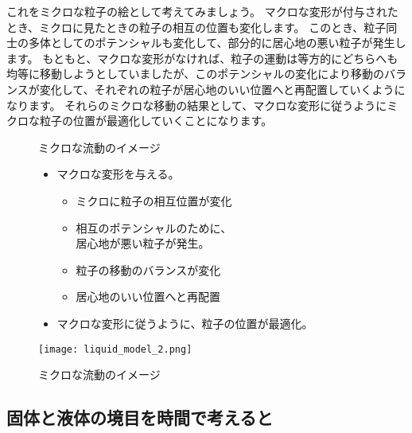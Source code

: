 \documentclass[uplatex,dvipdfmx,a4paper,11pt]{jsarticle}
\begin{document}
これをミクロな粒子の絵として考えてみましょう。
マクロな変形が付与されたとき、ミクロに見たときの粒子の相互の位置も変化します。
このとき、粒子同士の多体としてのポテンシャルも変化して、部分的に居心地の悪い粒子が発生します。
もともと、マクロな変形がなければ、粒子の運動は等方的にどちらへも均等に移動しようとしていましたが、このポテンシャルの変化により移動のバランスが変化して、それぞれの粒子が居心地のいい位置へと再配置していくようになります。
それらのミクロな移動の結果として、マクロな変形に従うようにミクロな粒子の位置が最適化していくことになります。
\begin{figure}[htb]
	\begin{center}
		\begin{minipage}{0.5\textwidth}
			\large
			\begin{itembox}[l]{ミクロな流動のイメージ}
				\begin{itemize}
					\item マクロな変形を与える。
					\begin{itemize}
						\item ミクロに粒子の相互位置が変化
						\item 相互のポテンシャルのために、\\居心地が悪い粒子が発生。
						\item 粒子の移動のバランスが変化
						\item 居心地のいい位置へと再配置
					\end{itemize}
					\item マクロな変形に従うように、粒子の位置が最適化。
				\end{itemize}
			\end{itembox}
		\end{minipage}
		\begin{minipage}{0.4\textwidth}
			\begin{center}
			\texttt{[image: liquid\_model\_2.png]}
			\end{center}
		\end{minipage}
		\caption{ミクロな流動のイメージ}
		\label{fig:micro_ryuudou}
	\end{center}
\end{figure}

\subsection{固体と液体の境目を時間で考えると}
\end{document}
